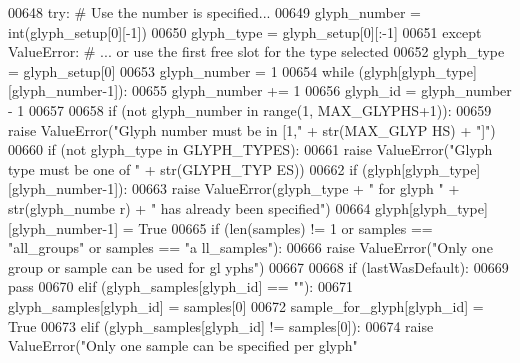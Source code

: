 \begin{DoxyCode}
00648                 \textcolor{keywordflow}{try}: \textcolor{comment}{# Use the number is specified...}
00649                     glyph\_number = int(glyph\_setup[0][-1])
00650                     glyph\_type = glyph\_setup[0][:-1]
00651                 \textcolor{keywordflow}{except} ValueError: \textcolor{comment}{# ... or use the first free slot for the type 
      selected}
00652                     glyph\_type = glyph\_setup[0]
00653                     glyph\_number = 1
00654                     \textcolor{keywordflow}{while} (glyph[glyph\_type][glyph\_number-1]):
00655                         glyph\_number += 1
00656                 glyph\_id = glyph\_number - 1
00657                 
00658                 \textcolor{keywordflow}{if} (\textcolor{keywordflow}{not} glyph\_number \textcolor{keywordflow}{in} range(1, MAX\_GLYPHS+1)):
00659                     \textcolor{keywordflow}{raise} ValueError(\textcolor{stringliteral}{"Glyph number must be in [1,"} + str(MAX\_GLYP
      HS) + \textcolor{stringliteral}{"]"})
00660                 \textcolor{keywordflow}{if} (\textcolor{keywordflow}{not} glyph\_type \textcolor{keywordflow}{in} GLYPH\_TYPES):
00661                     \textcolor{keywordflow}{raise} ValueError(\textcolor{stringliteral}{"Glyph type must be one of "} + str(GLYPH\_TYP
      ES))
00662                 \textcolor{keywordflow}{if} (glyph[glyph\_type][glyph\_number-1]):
00663                     \textcolor{keywordflow}{raise} ValueError(glyph\_type + \textcolor{stringliteral}{" for glyph "} + str(glyph\_numbe
      r) + \textcolor{stringliteral}{" has already been specified"})
00664                 glyph[glyph\_type][glyph\_number-1] = \textcolor{keyword}{True}
00665                 \textcolor{keywordflow}{if} (len(samples) != 1 \textcolor{keywordflow}{or} samples == \textcolor{stringliteral}{"all\_groups"} \textcolor{keywordflow}{or} samples == \textcolor{stringliteral}{"a
      ll\_samples"}):
00666                     \textcolor{keywordflow}{raise} ValueError(\textcolor{stringliteral}{"Only one group or sample can be used for gl
      yphs"})
00667 
00668                 \textcolor{keywordflow}{if} (lastWasDefault):
00669                     \textcolor{keywordflow}{pass}
00670                 \textcolor{keywordflow}{elif} (glyph\_samples[glyph\_id] == \textcolor{stringliteral}{""}):
00671                     glyph\_samples[glyph\_id] = samples[0]
00672                     sample\_for\_glyph[glyph\_id] = \textcolor{keyword}{True}
00673                 \textcolor{keywordflow}{elif} (glyph\_samples[glyph\_id] != samples[0]):
00674                     \textcolor{keywordflow}{raise} ValueError(\textcolor{stringliteral}{"Only one sample can be specified per glyph"
}
\end{DoxyCode}
